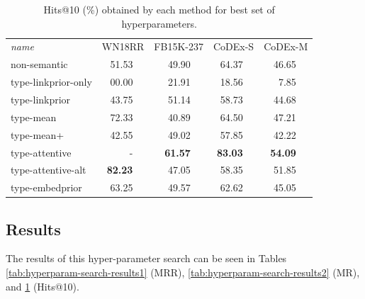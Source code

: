 \begin{table}[p]
    \def\fn{\hspace{2pt}} %
    \setlength{\tabcolsep}{5pt}
    \centering
    \begin{tabular}{lr@{\fn}lr@{\fn}lr@{\fn}lr@{\fn}l}
        \toprule
        \textit{name}
                &\multicolumn{2}{c}{WN18RR}
                            &\multicolumn{2}{c}{FB15K-237}   
                                           & \multicolumn{2}{c}{CoDEx-S}   
                                                                & \multicolumn{2}{c}{CoDEx-M} \\
        \cmidrule{1-9}
        non-semantic         & 51.53    && 49.90    && 64.37    && 46.65  \\
        \cmidrule{1-9}
        type-linkprior-only  & 00.00    && 21.91	&& 18.56    && 7.85   \\
        type-linkprior       & 43.75	&& 51.14    && 58.73    && 44.68    \\
        \cmidrule{1-9}
        type-mean            & 72.33    && 40.89    && 64.50    && 47.21  \\
        type-mean+           & 42.55    && 49.02    && 57.85    && 42.22  \\
        type-attentive       & -        && \textbf{61.57}     &%
                                                    & \textbf{83.03}     && \textbf{54.09}  \\
        type-attentive-alt   & \textbf{82.23}    && 47.05    && 58.35    && 51.85  \\
        \cmidrule{1-9}
        type-embedprior      & 63.25    && 49.57    && 62.62    && 45.05  \\
        \bottomrule
    \end{tabular} \vspace{1em}
    \caption[Hits@10 obtained by each method for best set of hyperparameters.]{Hits@10 (\%) obtained by each method for best set of hyperparameters. }\label{tab:hyperparam-search-results3}
\end{table}

\subsection{Results}\label{sec:experiments:results}
The results of this hyper-parameter search can be seen in Tables \ref{tab:hyperparam-search-results1} (MRR), \ref{tab:hyperparam-search-results2} (MR), and \ref{tab:hyperparam-search-results3} (Hits@10).

